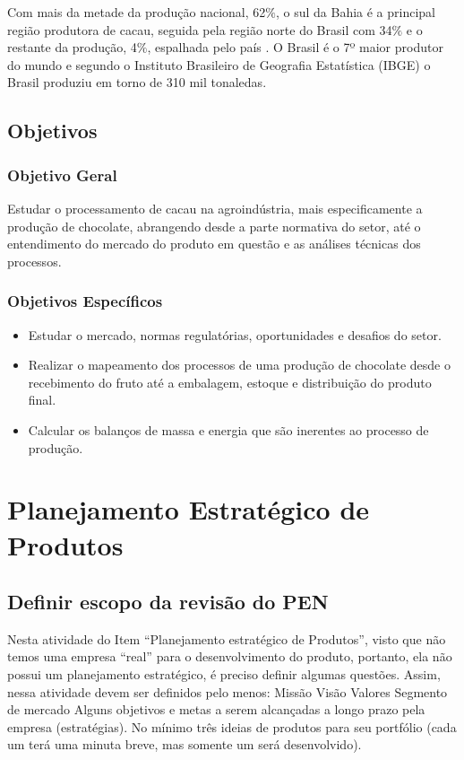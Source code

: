 \documentclass[
	12pt,				%
	openright,			%
	oneside,			%
	a4paper,			%
	english,			%
	french,				%
	spanish,			%
	brazil				%
	]{abntex2}
\begin{document}
Com mais da metade da produção nacional, 62$\%$, o sul da Bahia é a principal região produtora de cacau, seguida pela região norte do Brasil com 34$\%$ e o restante da produção, 4$\%$, espalhada pelo país \cite{1}. O Brasil é o 7º maior produtor do mundo e segundo o Instituto Brasileiro de Geografia Estatística (IBGE) o Brasil produziu em torno de 310 mil tonaledas. \cite{3} 

\section{Objetivos}

\subsection{Objetivo Geral}

Estudar o processamento de cacau na agroindústria, mais especificamente a produção de chocolate, abrangendo desde a parte normativa do setor, até o entendimento do mercado do produto em questão e as análises técnicas dos processos.

\subsection{Objetivos Específicos}

\begin{itemize}
\item Estudar o mercado, normas regulatórias, oportunidades e desafios do setor.
\item Realizar o mapeamento dos processos de uma produção de chocolate desde o recebimento do fruto até a embalagem, estoque e distribuição do produto final.
\item Calcular os balanços de massa e energia que são inerentes ao processo de produção.
\end{itemize}

\newpage
\chapter{Planejamento Estratégico de Produtos}

\section{Definir escopo da revisão do PEN}

Nesta atividade do Item “Planejamento estratégico de Produtos”, visto que
não temos uma empresa “real” para o desenvolvimento do produto, portanto,
ela não possui um planejamento estratégico, é preciso definir algumas
questões. Assim, nessa atividade devem ser definidos pelo menos:
Missão
Visão
Valores
Segmento de mercado
Alguns objetivos e metas a serem alcançadas a longo prazo pela empresa
(estratégias).
No mínimo três ideias de produtos para seu portfólio (cada um terá uma
minuta breve, mas somente um será desenvolvido).
\end{document}
